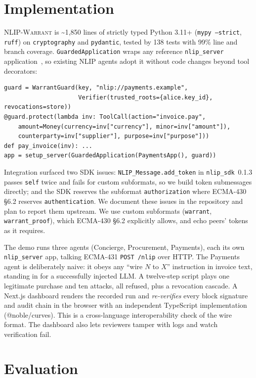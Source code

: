 \documentclass[sigconf,nonacm]{acmart}
\newcommand{\sys}{\textsc{NLIP-Warrant}}
\newcommand{\code}[1]{\texttt{\small #1}}
\begin{document}
\section{Implementation}
\sys{} is \textasciitilde1{,}850 lines of strictly typed Python 3.11+ (\code{mypy --strict}, \code{ruff}) on \code{cryptography} and \code{pydantic}, tested by 138 tests with 99\% line and branch coverage. \code{GuardedApplication} wraps any reference \code{nlip\_server} application~\cite{nlipsdk}, so existing NLIP agents adopt it without code changes beyond tool decorators:
\begin{lstlisting}
guard = WarrantGuard(key, "nlip://payments.example",
                     Verifier(trusted_roots={alice.key_id}, revocations=store))
@guard.protect(lambda inv: ToolCall(action="invoice.pay",
    amount=Money(currency=inv["currency"], minor=inv["amount"]),
    counterparty=inv["supplier"], purpose=inv["purpose"]))
def pay_invoice(inv): ...
app = setup_server(GuardedApplication(PaymentsApp(), guard))
\end{lstlisting} Integration surfaced two SDK issues: \code{NLIP\_Message.add\_token} in \code{nlip\_sdk}~0.1.3 passes \code{self} twice and fails for custom subformats, so we build token submessages directly; and the SDK reserves the subformat \code{authorization} where ECMA-430 §6.2 reserves \code{authentication}. We document these issues in the repository and plan to report them upstream. We use custom subformats (\code{warrant}, \code{warrant\_proof}), which ECMA-430 §6.2 explicitly allows, and echo peers' tokens as it requires.

The demo runs three agents (Concierge, Procurement, Payments), each its own \code{nlip\_server} app, talking ECMA-431 \code{POST /nlip} over HTTP. The Payments agent is deliberately naive: it obeys any ``wire $N$ to $X$'' instruction in invoice text, standing in for a successfully injected LLM. A twelve-step script plays one legitimate purchase and ten attacks, all refused, plus a revocation cascade. A Next.js dashboard renders the recorded run and \emph{re-verifies} every block signature and audit chain in the browser with an independent TypeScript implementation (@noble/curves). This is a cross-language interoperability check of the wire format. The dashboard also lets reviewers tamper with logs and watch verification fail.

\section{Evaluation}
\end{document}
